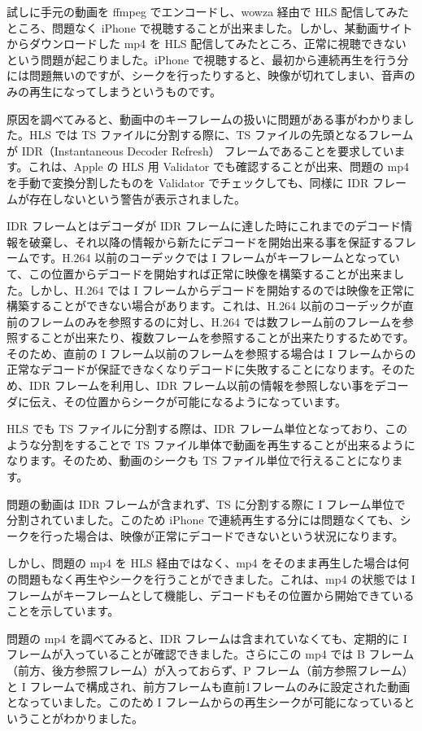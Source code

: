  試しに手元の動画を ffmpeg でエンコードし、wowza 経由で HLS 配信してみたところ、問題なく iPhone で視聴することが出来ました。しかし、某動画サイトからダウンロードした mp4 を HLS 配信してみたところ、正常に視聴できないという問題が起こりました。iPhone で視聴すると、最初から連続再生を行う分には問題無いのですが、シークを行ったりすると、映像が切れてしまい、音声のみの再生になってしまうというものです。

 原因を調べてみると、動画中のキーフレームの扱いに問題がある事がわかりました。HLS では TS ファイルに分割する際に、TS ファイルの先頭となるフレームが IDR（Instantaneous Decoder Refresh） フレームであることを要求しています。これは、Apple の HLS 用 Validator でも確認することが出来、問題の mp4 を手動で変換分割したものを Validator でチェックしても、同様に IDR フレームが存在しないという警告が表示されました。

 IDR フレームとはデコーダが IDR フレームに達した時にこれまでのデコード情報を破棄し、それ以降の情報から新たにデコードを開始出来る事を保証するフレームです。H.264 以前のコーデックでは I フレームがキーフレームとなっていて、この位置からデコードを開始すれば正常に映像を構築することが出来ました。しかし、H.264 では I フレームからデコードを開始するのでは映像を正常に構築することができない場合があります。これは、H.264 以前のコーデックが直前のフレームのみを参照するのに対し、H.264 では数フレーム前のフレームを参照することが出来たり、複数フレームを参照することが出来たりするためです。そのため、直前の I フレーム以前のフレームを参照する場合は I フレームからの正常なデコードが保証できなくなりデコードに失敗することになります。そのため、IDR フレームを利用し、IDR フレーム以前の情報を参照しない事をデコーダに伝え、その位置からシークが可能になるようになっています。

 HLS でも TS ファイルに分割する際は、IDR フレーム単位となっており、このような分割をすることで TS ファイル単体で動画を再生することが出来るようになります。そのため、動画のシークも TS ファイル単位で行えることになります。

 問題の動画は IDR フレームが含まれず、TS に分割する際に I フレーム単位で分割されていました。このため iPhone で連続再生する分には問題なくても、シークを行った場合は、映像が正常にデコードできないという状況になります。

 しかし、問題の mp4 を HLS 経由ではなく、mp4 をそのまま再生した場合は何の問題もなく再生やシークを行うことができました。これは、mp4 の状態では I フレームがキーフレームとして機能し、デコードもその位置から開始できていることを示しています。

 問題の mp4 を調べてみると、IDR フレームは含まれていなくても、定期的に I フレームが入っていることが確認できました。さらにこの mp4 では B フレーム（前方、後方参照フレーム）が入っておらず、P フレーム（前方参照フレーム）と I フレームで構成され、前方フレームも直前1フレームのみに設定された動画となっていました。このため I フレームからの再生シークが可能になっているということがわかりました。


